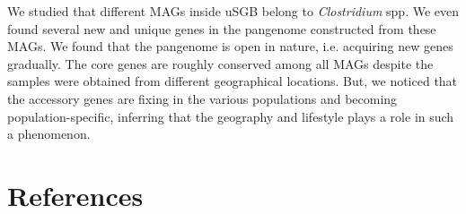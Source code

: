 \documentclass[11pt]{article}
\begin{document}
We studied that different MAGs inside uSGB belong to \textit{Clostridium} spp. We even found several new and unique genes in the pangenome constructed from these MAGs. We found that the pangenome is open in nature, i.e. acquiring new genes gradually. The core genes are roughly conserved among all MAGs despite the samples were obtained from different geographical locations. But, we noticed that the accessory genes are fixing in the various populations and becoming population-specific, inferring that the geography and lifestyle plays a role in such a phenomenon. 


\newpage



\section{References}


\newpage

\end{document}
